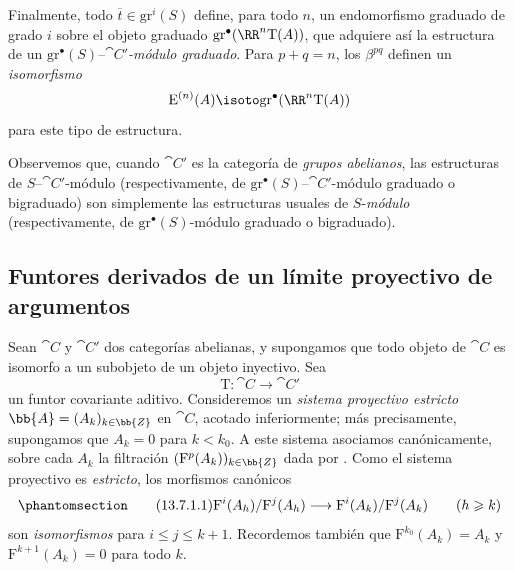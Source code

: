 \documentclass[oneside]{amsart}
\renewcommand{\leq}{\leqslant}
\renewcommand{\geq}{\geqslant}
\let\EGAOriginalLabel\label
\renewcommand{\label}[1]{\phantomsection\EGAOriginalLabel{#1}}
\begin{document}
\begin{env}[13.6.6]
Finalmente, todo $\overline{t}\in\mathrm{gr}^i(S)$ define, para todo
$n$, un endomorfismo graduado de grado $i$ sobre el objeto graduado
$\mathrm{gr}^\bullet(\RR^n\mathrm{T}(A))$, que adquiere así la
estructura de un
$\mathrm{gr}^\bullet(S)$--\emph{$\cat{C}'$-módulo graduado}.
Para $p+q=n$, los $\beta^{pq}$ definen un \emph{isomorfismo}
\[
  \mathrm{E}^{(n)}(A)
  \isoto
  \mathrm{gr}^\bullet(\RR^n\mathrm{T}(A))
\]
para este tipo de estructura.

Observemos que, cuando $\cat{C}'$ es la categoría de \emph{grupos abelianos}, las
estructuras de $S$--$\cat{C}'$-módulo (respectivamente, de
$\mathrm{gr}^\bullet(S)$--$\cat{C}'$-módulo graduado o bigraduado) son
simplemente las estructuras usuales de $S$-\emph{módulo} (respectivamente, de
$\mathrm{gr}^\bullet(S)$-módulo graduado o bigraduado).
\end{env}

\subsection{Funtores derivados de un límite proyectivo de argumentos}
\label{subsection:0.13.7}
\label{0.13.7}

\begin{env}[13.7.1]
\label{0.13.7.1}
Sean $\cat{C}$ y $\cat{C}'$ dos categorías abelianas, y supongamos
que todo objeto de $\cat{C}$ es isomorfo a un subobjeto de un
objeto inyectivo.
Sea
\[
  \mathrm{T}:\cat{C}\longrightarrow\cat{C}'
\]
un funtor covariante aditivo.
Consideremos un \emph{sistema proyectivo estricto}
$\bb{A}=(A_k)_{k\in\bb{Z}}$ en $\cat{C}$, acotado inferiormente; más
precisamente, supongamos que $A_k=0$ para $k<k_0$.
A este sistema asociamos canónicamente, sobre cada $A_k$ la
filtración $(\mathrm{F}^p(A_k))_{k\in\bb{Z}}$ dada por
.
Como el sistema proyectivo es \emph{estricto}, los morfismos canónicos
\begin{equation}
\label{0.13.7.1.1}
\tag{13.7.1.1}
  \mathrm{F}^i(A_h)/\mathrm{F}^j(A_h)
  \longrightarrow
  \mathrm{F}^i(A_k)/\mathrm{F}^j(A_k)
  \qquad(h\geq k)
\end{equation}
son \emph{isomorfismos} para $i\leq j\leq k+1$.
Recordemos también que
$\mathrm{F}^{k_0}(A_k)=A_k$ y
$\mathrm{F}^{k+1}(A_k)=0$ para todo $k$.
\end{env}
\end{document}

